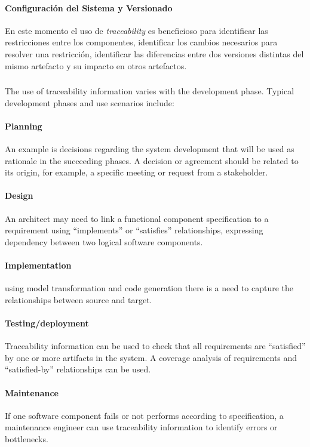 \documentclass[a4paper,12pt,oneside,spanish]{book}
\begin{document}
\paragraph{Configuración del Sistema y Versionado} En este momento el uso de \textit{traceability} es beneficioso para identificar las restricciones entre los componentes, identificar los cambios necesarios para resolver una restricción, identificar las diferencias entre dos versiones distintas del mismo artefacto y su impacto en otros artefactos.


\subsubsection{}
\cite{DSIS} The use of traceability information varies with the development phase. Typical development phases and use scenarios include:

\paragraph{Planning} An example is decisions regarding the system development that will be
used as rationale in the succeeding phases. A decision or agreement should be related to its origin, for example, a specific meeting or request from a stakeholder.

\paragraph{Design} An architect may need to link a functional component specification to a requirement using “implements” or “satisfies” relationships, expressing dependency between two logical software components.

\paragraph{Implementation} using model transformation and code generation there is a need to
capture the relationships between source and target.

\paragraph{Testing/deployment} Traceability information can be used to check that all requirements are “satisfied” by one or more artifacts in the system. A coverage analysis
of requirements and “satisfied-by” relationships can be used.

\paragraph{Maintenance} If one software component fails or not performs according to specification, a maintenance engineer can use traceability information to identify errors
or bottlenecks.
\end{document}
